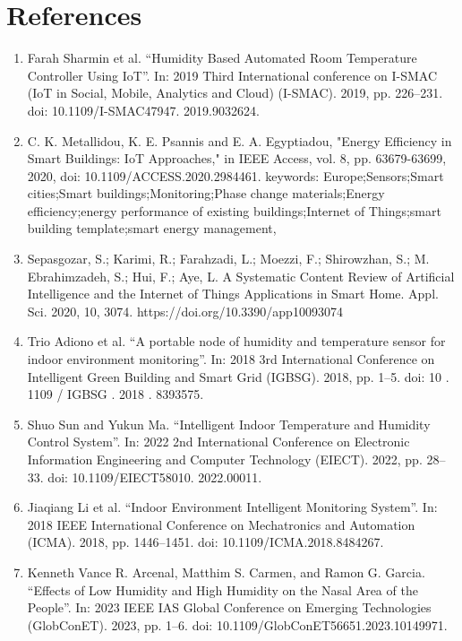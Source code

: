 \documentclass[a4paper]{scrartcl}
\begin{document}
\section{References}
\begin{enumerate}
    \item Farah Sharmin et al. “Humidity Based Automated Room Temperature Controller Using
IoT”. In: 2019 Third International conference on I-SMAC (IoT in Social, Mobile,
Analytics and Cloud) (I-SMAC). 2019, pp. 226–231. doi: 10.1109/I-SMAC47947.
2019.9032624.
    \item C. K. Metallidou, K. E. Psannis and E. A. Egyptiadou, "Energy Efficiency in Smart Buildings: IoT Approaches," in IEEE Access, vol. 8, pp. 63679-63699, 2020, doi: 10.1109/ACCESS.2020.2984461.
keywords: {Europe;Sensors;Smart cities;Smart buildings;Monitoring;Phase change materials;Energy efficiency;energy performance of existing buildings;Internet of Things;smart building template;smart energy management},

    \item Sepasgozar, S.; Karimi, R.; Farahzadi, L.; Moezzi, F.; Shirowzhan, S.; M. Ebrahimzadeh, S.; Hui, F.; Aye, L. A Systematic Content Review of Artificial Intelligence and the Internet of Things Applications in Smart Home. Appl. Sci. 2020, 10, 3074. https://doi.org/10.3390/app10093074
    
    \item Trio Adiono et al. “A portable node of humidity and temperature sensor for indoor
environment monitoring”. In: 2018 3rd International Conference on Intelligent Green
Building and Smart Grid (IGBSG). 2018, pp. 1–5. doi: 10 . 1109 / IGBSG . 2018 .
8393575.
    \item Shuo Sun and Yukun Ma. “Intelligent Indoor Temperature and Humidity Control System”.
In: 2022 2nd International Conference on Electronic Information Engineering
and Computer Technology (EIECT). 2022, pp. 28–33. doi: 10.1109/EIECT58010.
2022.00011.

    \item Jiaqiang Li et al. “Indoor Environment Intelligent Monitoring System”. In: 2018
IEEE International Conference on Mechatronics and Automation (ICMA). 2018,
pp. 1446–1451. doi: 10.1109/ICMA.2018.8484267.

    \item Kenneth Vance R. Arcenal, Matthim S. Carmen, and Ramon G. Garcia. “Effects of
Low Humidity and High Humidity on the Nasal Area of the People”. In: 2023 IEEE
IAS Global Conference on Emerging Technologies (GlobConET). 2023, pp. 1–6. doi:
10.1109/GlobConET56651.2023.10149971.


\end{enumerate}
\end{document}
